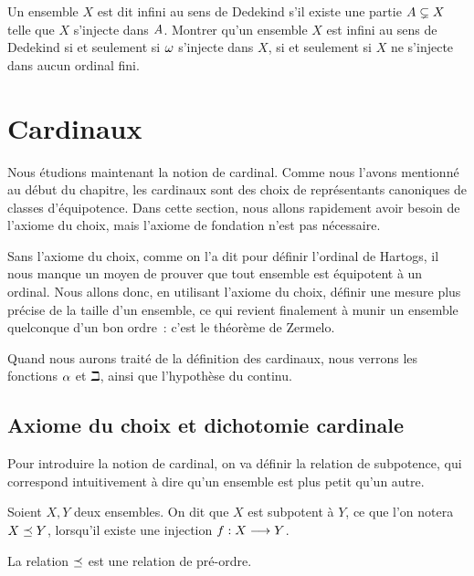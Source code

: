 \begin{exercise}
  Un ensemble $X$ est dit infini au sens de Dedekind s'il existe une partie
  $A\subsetneq X$ telle que $X$ s'injecte dans $A$. Montrer qu'un
  ensemble $X$ est infini au sens de Dedekind si et seulement si $\omega$ s'injecte
  dans $X$, si et seulement si $X$ ne s'injecte dans aucun ordinal fini.
\end{exercise}

\section{Cardinaux}

Nous étudions maintenant la notion de cardinal. Comme nous l'avons mentionné
au début du chapitre, les cardinaux sont des choix de représentants canoniques
de classes d'équipotence. Dans cette section, nous allons rapidement avoir
besoin de l'axiome du choix, mais l'axiome de fondation n'est pas nécessaire.

Sans l'axiome du choix, comme on l'a dit pour définir l'ordinal de Hartogs, il
nous manque un moyen de prouver que tout ensemble est équipotent à un ordinal.
Nous allons donc, en utilisant l'axiome du choix, définir une mesure plus
précise de la taille d'un ensemble, ce qui revient finalement à munir un
ensemble quelconque d'un bon ordre~: c'est le théorème de Zermelo.

Quand nous aurons traité de la définition des cardinaux, nous verrons les
fonctions $\alpha$ et $\beth$, ainsi que l'hypothèse du continu.

\subsection{Axiome du choix et dichotomie cardinale}

Pour introduire la notion de cardinal, on va définir la relation de subpotence,
qui correspond intuitivement à dire qu'un ensemble est plus petit qu'un autre.

\begin{definition}[Subpotence]
  Soient $X,Y$ deux ensembles. On dit que $X$ est subpotent à $Y$, ce que l'on
  notera $X\preceq Y$, lorsqu'il existe une injection $f : \displaystyle X \longrightarrow Y$.
\end{definition}

\begin{property}
  La relation $\preceq$ est une relation de pré-ordre.
\end{property}

